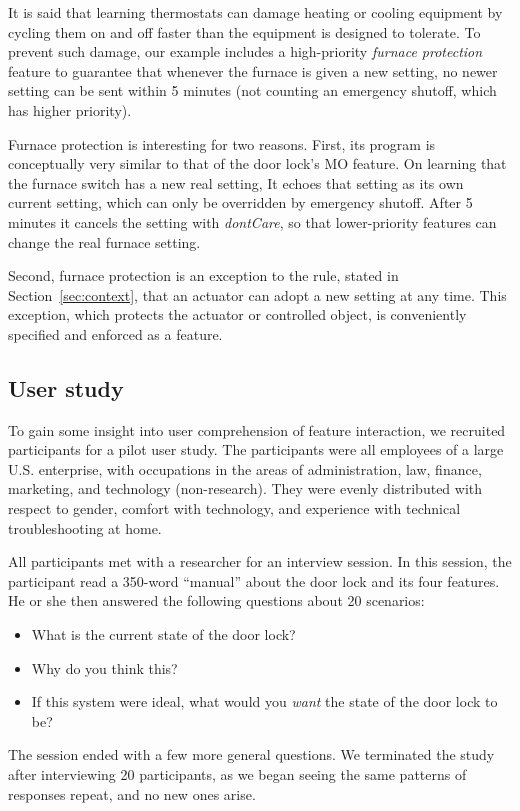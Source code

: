 \documentclass[conference]{IEEEtran}
\begin{document}
It is said that learning thermostats can damage heating or cooling
equipment
by cycling them on and off faster than the equipment is designed to
tolerate.
To prevent such damage, our example includes a high-priority
{\it furnace protection}
feature to guarantee that whenever the furnace is given a new setting,
no newer setting can be sent within 5 minutes (not counting an
emergency shutoff, which has higher priority).

Furnace protection is interesting for two reasons.
First, its program is conceptually very similar to that of the door
lock's MO feature.
On learning that the furnace switch has a new real setting,
It echoes that setting as its own current setting, which can only
be overridden by emergency shutoff.
After 5 minutes it cancels the setting with {\it dontCare}, so that
lower-priority features can change the real furnace setting.

Second, furnace protection is an exception to the rule, stated in
Section~\ref{sec:context}, that an actuator can adopt a new setting
at any time.
This exception, which protects the actuator or controlled object,
is conveniently specified and enforced as a feature.

\subsection{User study}

To gain some insight into user comprehension of feature interaction,
we recruited participants for a pilot user study.
The participants were all employees of a large U.S. enterprise,
with occupations in the areas of administration, law, finance,
marketing, and technology (non-research).
They were evenly distributed with respect to gender, comfort with
technology, and experience with technical troubleshooting at home.

All participants met with a researcher for an interview session.
In this session, the participant read a 350-word ``manual'' 
about the door lock
and its four features.
He or she then answered the following questions about 20 scenarios:
\begin{itemize}
\item
What is the current state of the door lock?
\item
Why do you think this?
\item
If this system were ideal, what would you {\it want} the state of the
door lock to be?
\end{itemize}
The session ended with a few more general questions.
We terminated the study after interviewing 20 participants, as we began
seeing the same patterns of responses repeat, and no new ones arise.
\end{document}
